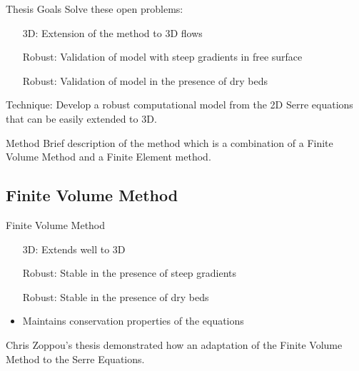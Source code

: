 \documentclass[handout]{beamer}
\begin{document}
\begin{frame}{Thesis Goals}
	Solve these open problems:
	\begin{itemize}
		\item[3D:] Extension of the method to 3D flows
		\item[Robust:] Validation of model with steep gradients in free surface
		\item[Robust:] Validation of model in the presence of dry beds
	\end{itemize}		
	\medskip
	\pause
	Technique: Develop a robust computational model from the 2D Serre equations that can be easily extended to 3D. 
\end{frame}

\begin{frame}{Method}
	Brief description of the method which is a combination of a Finite Volume Method and a Finite Element method. 
\end{frame}
\subsection{Finite Volume Method}
\begin{frame}{Finite Volume Method}
\begin{itemize}
	\item[3D:] Extends well to 3D
	\item[Robust:] Stable in the presence of steep gradients
	\item[Robust:] Stable in the presence of dry beds
	\item Maintains conservation properties of the equations
\end{itemize}
\pause  Chris Zoppou's thesis demonstrated how an adaptation of the Finite Volume Method to the Serre Equations.
\end{frame}
\end{document}
